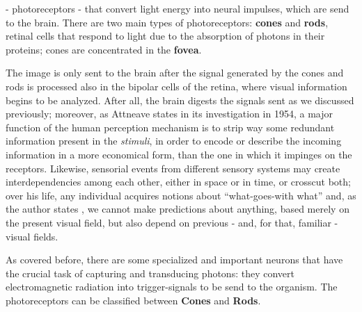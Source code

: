 - photoreceptors - that convert light energy into neural impulses,
which are send to the brain. There are two main types of photoreceptors: \textbf{cones} and
\textbf{rods},
retinal cells that respond to light due to the absorption of photons in their proteins; cones are concentrated in the \textbf{fovea}. \par
%
The image is only sent to the brain after the signal generated by the cones and rods is processed also
in the bipolar cells of the retina, where visual information begins to be analyzed. After all, the brain digests the signals sent as we discussed
previously; moreover, as Attneave \cite{Attneave1954} states in its investigation in 1954, a major function of
the human perception mechanism is to strip way some redundant information present in the \emph{stimuli},
in order to encode or describe the incoming information in a more economical form, than the one in which
it impinges on the receptors. Likewise, sensorial events from different sensory systems may create
interdependencies among each other, either in space or in time, or crosscut both; over his life, any
individual acquires notions about “what-goes-with what” and, as the author states \cite{Attneave1954}, we cannot make
predictions about anything, based merely on the present visual field, but also depend on previous - and,
for that, familiar - visual fields. \par
As covered before, there are some specialized and important neurons
that have the crucial task of capturing and transducing photons: they convert electromagnetic radiation
into trigger-signals to be send to the organism.
The photoreceptors can be classified between \textbf{Cones} and \textbf{Rods}. \par
%
